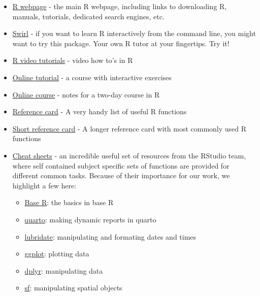 \documentclass[
  letterpaper,
  DIV=11,
  numbers=noendperiod]{scrartcl}
\providecommand{\tightlist}{%
  \setlength{\itemsep}{0pt}\setlength{\parskip}{0pt}}
\begin{document}
\begin{itemize}
\item
  \href{http://r-project.org}{R webpage} - the main R webpage, including
  links to downloading R, manuals, tutorials, dedicated search engines,
  etc.
\item
  \href{https://swirlstats.com/}{Swirl} - if you want to learn R
  interactively from the command line, you might want to try this
  package. Your own R tutor at your fingertips. Try it!
\item
  \href{http://blog.revolutionanalytics.com/2013/08/google-video-r-tutorials.html}{R
  video tutorials} - video how to's in R
\item
  \href{http://www.datamind.org/}{Online tutorial} - a course with
  interactive exercises
\item
  \href{http://faculty.washington.edu/tlumley/Rcourse/}{Online course} -
  notes for a two-day course in R
\item
  \href{http://cran.r-project.org/doc/contrib/refcard.pdf}{Reference
  card} - A very handy list of useful R functions
\item
  \href{http://cran.r-project.org/doc/contrib/Short-refcard.pdf}{Short
  reference card} - A longer reference card with most commonly used R
  functions
\item
  \href{https://rstudio.github.io/cheatsheets/}{Cheat sheets} - an
  incredible useful set of resources from the RStudio team, where self
  contained subject specific sets of functions are provided for
  different common tasks. Because of their importance for our work, we
  highlight a few here:

  \begin{itemize}
  \tightlist
  \item
    \href{https://iqss.github.io/dss-workshops/R/Rintro/base-r-cheat-sheet.pdf}{Base
    R}: the basics in base R
  \item
    \href{https://rstudio.github.io/cheatsheets/quarto.pdf}{quarto}:
    making dynamic reports in quarto
  \item
    \href{https://rstudio.github.io/cheatsheets/html/lubridate.html}{lubridate}:
    manipulating and formating dates and times
  \item
    \href{https://rstudio.github.io/cheatsheets/html/data-visualization.html}{ggplot}:
    plotting data
  \item
    \href{https://rstudio.github.io/cheatsheets/html/data-transformation.html}{dplyr}:
    manipulating data
  \item
    \href{https://rstudio.github.io/cheatsheets/sf.pdf}{sf}:
    manipulating spatial objects
  \end{itemize}
\end{itemize}
\end{document}
